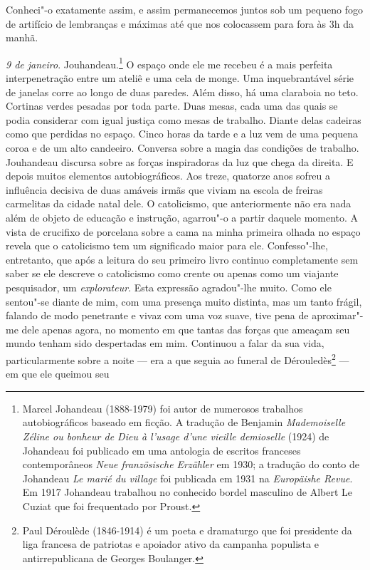Conheci"-o exatamente assim, e assim permanecemos juntos sob um pequeno
fogo de artifício de lembranças e máximas até que nos colocassem para
fora às 3h da manhã.

\emph{9 de janeiro}. Jouhandeau.\footnote{Marcel Johandeau
  (1888-1979) foi autor de numerosos trabalhos autobiográficos baseado
  em ficção. A tradução de Benjamin \emph{Mademoiselle Zéline ou bonheur
  de Dieu à l'usage d'une vieille demioselle} (1924) de Johandeau foi
  publicado em uma antologia de escritos franceses contemporâneos
  \emph{Neue französische Erzähler} em 1930; a tradução do conto de
  Johandeau \emph{Le marié du village} foi publicada em 1931 na
  \emph{Europäishe Revue}. Em 1917 Johandeau trabalhou no conhecido
  bordel masculino de Albert Le Cuziat que foi frequentado por Proust. \versal{[N. E.]}}
O espaço onde ele me recebeu é a mais perfeita interpenetração entre um
ateliê e uma cela de monge. Uma inquebrantável série de janelas corre ao
longo de duas paredes. Além disso, há uma claraboia no teto. Cortinas
verdes pesadas por toda parte. Duas mesas, cada uma das quais se podia
considerar com igual justiça como mesas de trabalho. Diante delas
cadeiras como que perdidas no espaço. Cinco horas da tarde e a luz vem
de uma pequena coroa e de um alto candeeiro. Conversa sobre a magia das
condições de trabalho. Jouhandeau discursa sobre as forças inspiradoras
da luz que chega da direita. E depois muitos elementos autobiográficos.
Aos treze, quatorze anos sofreu a influência decisiva de duas amáveis
irmãs que viviam na escola de freiras carmelitas da cidade natal dele. O
catolicismo, que anteriormente não era nada além de objeto de educação e
instrução, agarrou"-o a partir daquele momento. A vista de crucifixo de
porcelana sobre a cama na minha primeira olhada no espaço revela que o
catolicismo tem um significado maior para ele. Confesso"-lhe, entretanto,
que após a leitura do seu primeiro livro continuo completamente sem
saber se ele descreve o catolicismo como crente ou apenas como um
viajante pesquisador, um \emph{explorateur}. Esta expressão agradou"-lhe
muito. Como ele sentou"-se diante de mim, com uma presença muito
distinta, mas um tanto frágil, falando de modo penetrante e vivaz com
uma voz suave, tive pena de aproximar"-me dele apenas agora, no momento
em que tantas das forças que ameaçam seu mundo tenham sido despertadas
em mim. Continuou a falar da sua vida, particularmente sobre a noite ---
era a que seguia ao funeral de Dérouledès\footnote{Paul Déroulède
  (1846-1914) é um poeta e dramaturgo que foi presidente da liga
  francesa de patriotas e apoiador ativo da campanha populista e
  antirrepublicana de Georges Boulanger. \versal{[N. E.]}} --- em que ele queimou seu
